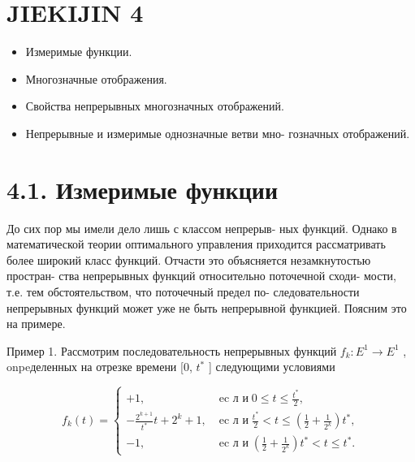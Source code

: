 \documentclass[8pt]{extarticle}
\begin{document}
\section*{JIEKIJIN 4}

\begin{itemize}\relax
\item\relax Измеримые функции.
\end{itemize}

\begin{itemize}\relax
\item\relax Многозначные отображения.
\end{itemize}

\begin{itemize}\relax
\item\relax Свойства непрерывных многозначных отображений.
\end{itemize}

\begin{itemize}\relax
\item\relax Непрерывные и измеримые однозначные ветви мно- гозначных отображений.
\end{itemize}

\section*{4.1. Измеримые функции}

До сих пор мы имели дело лишь с классом непрерыв- ных функций. Однако в математической теории оптимального управления приходится рассматривать более широкий класс функций. Отчасти это объясняется незамкнутостью простран- ства непрерывных функций относительно поточечной сходи- мости, т.е. тем обстоятельством, что поточечный предел по- следовательности непрерывных функций может уже не быть непрерывной функцией. Поясним это на примере.

Пример 1. Рассмотрим последовательность непрерывных функций \({f}_{k} : {E}^{1} \rightarrow  {E}^{1}\) , onpeделенных на отрезке времени [0, \({t}^{ * }\) ] следующими условиями

\[
{f}_{k}\left( t\right)  = \left\{  \begin{array}{ll}  + 1, & \operatorname{ec\text{ л }\text{ и }}0 \leq  t \leq  \frac{{t}^{ * }}{2}, \\   - \frac{{2}^{k + 1}}{{t}^{ * }}t + {2}^{k} + 1, & \operatorname{ec\text{ л }\text{ и }}\frac{{t}^{ * }}{2} < t \leq  \left( {\frac{1}{2} + \frac{1}{{2}^{k}}}\right) {t}^{ * }, \\   - 1, & \operatorname{ec\text{ л }\text{ и }}\left( {\frac{1}{2} + \frac{1}{{2}^{k}}}\right) {t}^{ * } < t \leq  {t}^{ * }. \end{array}\right.
\]
\end{document}
